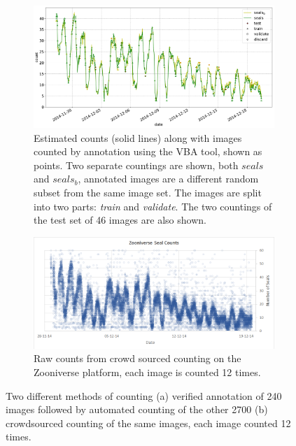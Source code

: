  
\begin{figure}[pht!]
    \centering
    
    \begin{subfigure}[t]{1.0\linewidth}
    \includegraphics[width=1.0\linewidth]{charts/seals/seals_combined.pdf}
    \caption{Estimated counts (solid lines) along with images counted by annotation using the \gls{VBA} tool, shown as points. Two separate countings are shown, both $seals$ and $seals_b$, annotated images are a different random subset from the same image set. The images are split into two parts: \emph{train} and \emph{validate}. The two countings of the test set of 46 images are also shown. }
    \label{fig:turtle_rock}
    \end{subfigure}
    
    \begin{subfigure}[t]{1.0\linewidth}
    \includegraphics[width=1.0\linewidth]{figures/annotation/zooniverse.png}
    \caption{Raw counts from crowd sourced counting on the Zooniverse \cite{Zooniverse} platform, each image is counted 12 times. \cite{Eisert2017}}
    \label{fig:zooniverse_counts}
    \end{subfigure}
    
    \caption{Two different methods of counting (a) verified annotation of 240 images followed by automated counting of the other 2700 (b) crowdsourced counting of the same images, each image counted 12 times. }
    \label{fig:seals_timeseries}
\end{figure} 




